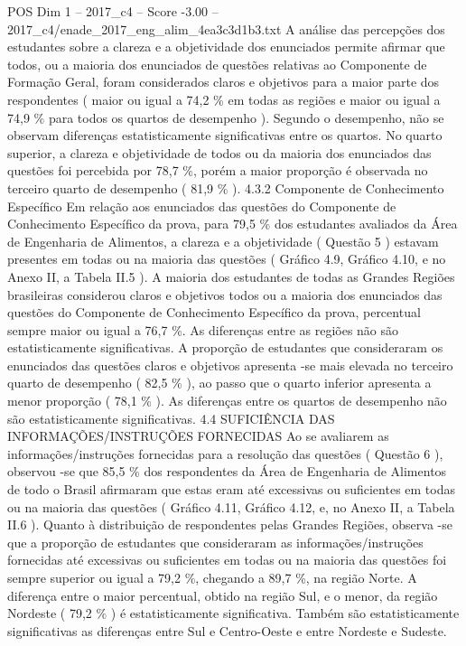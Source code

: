 \begin{textsample}{POS Dim 1 – 2017\_c4 – Score -3.00 – 2017\_c4/enade\_2017\_eng\_alim\_4ea3c3d1b3.txt}
A análise das percepções dos estudantes sobre a clareza e a objetividade dos enunciados permite afirmar que todos, ou a maioria dos enunciados de questões relativas ao Componente de Formação Geral, foram considerados claros e objetivos para a maior parte dos respondentes ( maior ou igual a 74,2 \% em todas as regiões e maior ou igual a 74,9 \% para todos os quartos de desempenho ).
Segundo o desempenho, não se observam diferenças estatisticamente significativas entre os quartos.
No quarto superior, a clareza e objetividade de todos ou da maioria dos enunciados das questões foi percebida por 78,7 \%, porém a maior proporção é observada no terceiro quarto de desempenho ( 81,9 \% ). 4.3.2 Componente de Conhecimento Específico Em relação aos enunciados das questões do Componente de Conhecimento Específico da prova, para 79,5 \% dos estudantes avaliados da Área de Engenharia de Alimentos, a clareza e a objetividade ( Questão 5 ) estavam presentes em todas ou na maioria das questões ( Gráfico 4.9, Gráfico 4.10, e no Anexo II, a Tabela II.5 ).
A maioria dos estudantes de todas as Grandes Regiões brasileiras considerou claros e objetivos todos ou a maioria dos enunciados das questões do Componente de Conhecimento Específico da prova, percentual sempre maior ou igual a 76,7 \%.
As diferenças entre as regiões não são estatisticamente significativas.
A proporção de estudantes que consideraram os enunciados das questões claros e objetivos apresenta -se mais elevada no terceiro quarto de desempenho ( 82,5 \% ), ao passo que o quarto inferior apresenta a menor proporção ( 78,1 \% ).
As diferenças entre os quartos de desempenho não são estatisticamente significativas. 4.4 SUFICIÊNCIA DAS INFORMAÇÕES/INSTRUÇÕES FORNECIDAS Ao se avaliarem as informações/instruções fornecidas para a resolução das questões ( Questão 6 ), observou -se que 85,5 \% dos respondentes da Área de Engenharia de Alimentos de todo o Brasil afirmaram que estas eram até excessivas ou suficientes em todas ou na maioria das questões ( Gráfico 4.11, Gráfico 4.12, e, no Anexo II, a Tabela II.6 ).
Quanto à distribuição de respondentes pelas Grandes Regiões, observa -se que a proporção de estudantes que consideraram as informações/instruções fornecidas até excessivas ou suficientes em todas ou na maioria das questões foi sempre superior ou igual a 79,2 \%, chegando a 89,7 \%, na região Norte.
A diferença entre o maior percentual, obtido na região Sul, e o menor, da região Nordeste ( 79,2 \% ) é estatisticamente significativa.
Também são estatisticamente significativas as diferenças entre Sul e Centro-Oeste e entre Nordeste e Sudeste.

\end{textsample}
